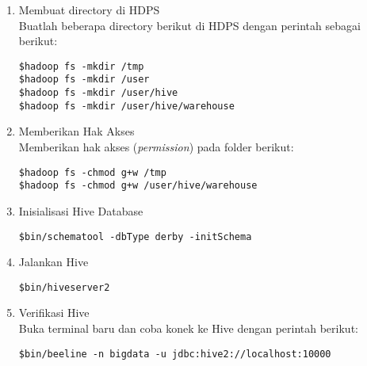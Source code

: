 \documentclass[a4paper]{tufte-handout}
\begin{document}
\begin{enumerate}
\item Membuat directory di HDPS \\
Buatlah beberapa directory berikut di HDPS dengan perintah sebagai berikut:

{\tt \$hadoop fs -mkdir /tmp} \\
{\tt \$hadoop fs -mkdir /user} \\
{\tt \$hadoop fs -mkdir /user/hive} \\
{\tt \$hadoop fs -mkdir /user/hive/warehouse}

\item Memberikan Hak Akses \\
Memberikan hak akses (\textit{permission}) pada folder berikut:

{\tt \$hadoop fs -chmod g+w /tmp} \\
{\tt \$hadoop fs -chmod g+w /user/hive/warehouse}

\item Inisialisasi Hive Database

{\tt \$bin/schematool -dbType derby -initSchema}

\item Jalankan Hive

{\tt \$bin/hiveserver2}

\item Verifikasi Hive \\
Buka terminal baru dan coba konek ke Hive dengan perintah berikut:

{\tt \$bin/beeline -n bigdata -u jdbc:hive2://localhost:10000}

\end{enumerate}

\clearpage
{}

\end{document}
